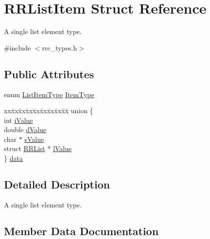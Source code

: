 \hypertarget{struct_r_r_list_item}{}\section{R\+R\+List\+Item Struct Reference}
\label{struct_r_r_list_item}


A single list element type.  




{\ttfamily \#include $<$rrc\+\_\+types.\+h$>$}

\subsection*{Public Attributes}
\begin{DoxyCompactItemize}
\item 
enum \hyperlink{rrc__types_8h_ab99437ab2e88aa90b7ebb8add042b25e}{List\+Item\+Type} \hyperlink{struct_r_r_list_item_a588ebb27c785286b9c809720be675a1d}{Item\+Type}
\item 
\begin{tabbing}
xx\=xx\=xx\=xx\=xx\=xx\=xx\=xx\=xx\=\kill
union \{\\
\>int \hyperlink{struct_r_r_list_item_ae15de7b1f1a6471da72b9772c53cc1da}{iValue}\\
\>double \hyperlink{struct_r_r_list_item_a6d5c2beab9812853769f9a32768207c2}{dValue}\\
\>char $\ast$ \hyperlink{struct_r_r_list_item_acfcabe3d9036821e5631222561c69951}{sValue}\\
\>struct \hyperlink{struct_r_r_list}{RRList} $\ast$ \hyperlink{struct_r_r_list_item_a7ba0216f30cfc65a905470abcf01534d}{lValue}\\
\} \hyperlink{struct_r_r_list_item_ade12f730888a69192a77e668a20fc00e}{data}\\

\end{tabbing}\end{DoxyCompactItemize}


\subsection{Detailed Description}
A single list element type. 

\subsection{Member Data Documentation}
\hypertarget{struct_r_r_list_item_ade12f730888a69192a77e668a20fc00e}{}
